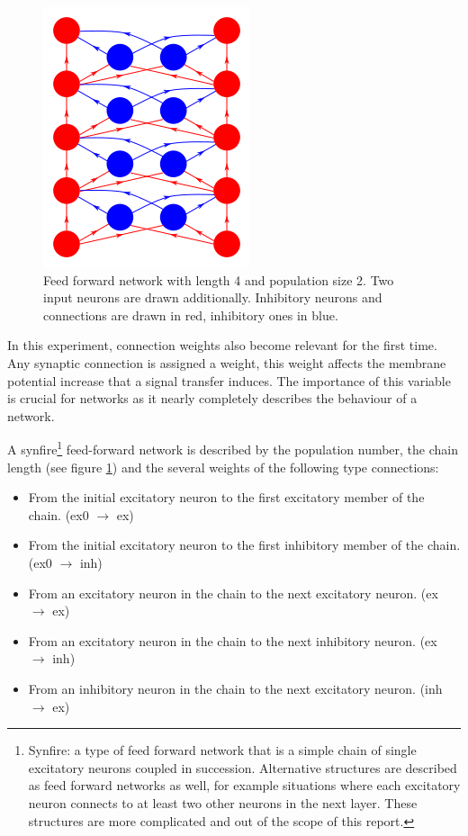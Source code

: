 \documentclass[10pt,a4paper]{article}
\begin{document}
\begin{figure}
    \centering
    \includegraphics[width=.3\textwidth]{figures/feedforward-real.png}
    \caption{Feed forward network with length 4 and population size 2. Two input
        neurons are drawn additionally. Inhibitory neurons and connections are drawn
        in red, inhibitory ones in blue.}
    \label{fig:feed-forward}
\end{figure}

In this experiment, connection weights also become relevant for the first time.
Any synaptic connection is assigned a weight, this weight affects the
membrane potential increase that a signal transfer induces. The importance of
this variable is crucial for networks as it nearly completely describes the
behaviour of a network.

A synfire\footnote{Synfire: a type of feed forward network that is a simple
    chain of single excitatory neurons coupled in succession. Alternative
    structures are described as feed forward networks as well, for example
    situations where each excitatory neuron connects to at least two other
    neurons in the next layer.  These structures are more complicated and out of
the scope of this report.} feed-forward network is described by the population
number, the chain length (see figure \ref{fig:feed-forward}) and the several
weights of the following type connections:

\begin{itemize}
    \item From the initial excitatory neuron to the first excitatory member of the
        chain. (ex0 $\rightarrow$ ex)
    \item From the initial excitatory neuron to the first inhibitory member of the
        chain. (ex0 $\rightarrow$ inh)
    \item From an excitatory neuron in the chain to the next excitatory neuron.
        (ex $\rightarrow$ ex)
    \item From an excitatory neuron in the chain to the next inhibitory neuron.
        (ex $\rightarrow$ inh)
    \item From an inhibitory neuron in the chain to the next excitatory neuron.
        (inh $\rightarrow$ ex)
\end{itemize}
\end{document}
